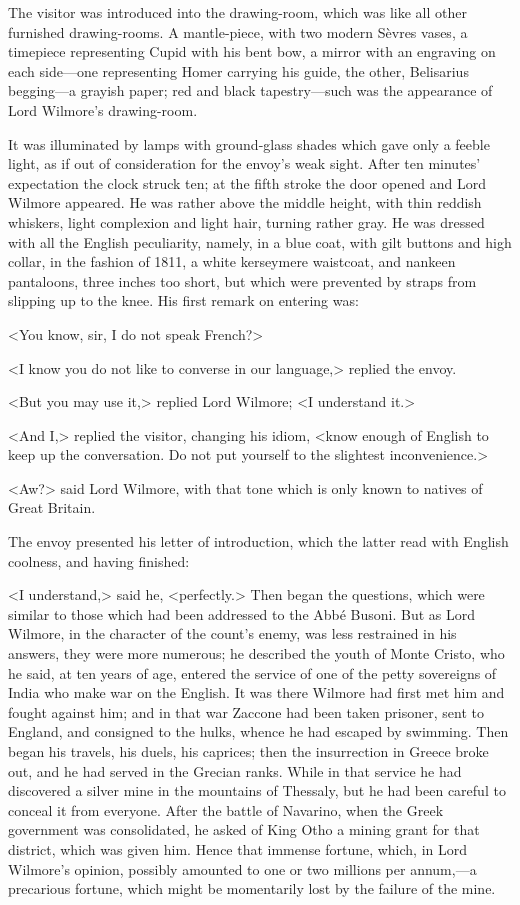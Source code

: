  The visitor was introduced into the drawing-room, which was like all other furnished drawing-rooms. A mantle-piece, with two modern Sèvres vases, a timepiece representing Cupid with his bent bow, a mirror with an engraving on each side—one representing Homer carrying his guide, the other, Belisarius begging—a grayish paper; red and black tapestry—such was the appearance of Lord Wilmore's drawing-room. 

 It was illuminated by lamps with ground-glass shades which gave only a feeble light, as if out of consideration for the envoy's weak sight. After ten minutes' expectation the clock struck ten; at the fifth stroke the door opened and Lord Wilmore appeared. He was rather above the middle height, with thin reddish whiskers, light complexion and light hair, turning rather gray. He was dressed with all the English peculiarity, namely, in a blue coat, with gilt buttons and high collar, in the fashion of 1811, a white kerseymere waistcoat, and nankeen pantaloons, three inches too short, but which were prevented by straps from slipping up to the knee. His first remark on entering was: 

 <You know, sir, I do not speak French?> 

 <I know you do not like to converse in our language,> replied the envoy. 

 <But you may use it,> replied Lord Wilmore; <I understand it.> 

 <And I,> replied the visitor, changing his idiom, <know enough of English to keep up the conversation. Do not put yourself to the slightest inconvenience.> 

 <Aw?> said Lord Wilmore, with that tone which is only known to natives of Great Britain. 

 The envoy presented his letter of introduction, which the latter read with English coolness, and having finished: 

 <I understand,> said he, <perfectly.>  Then began the questions, which were similar to those which had been addressed to the Abbé Busoni. But as Lord Wilmore, in the character of the count's enemy, was less restrained in his answers, they were more numerous; he described the youth of Monte Cristo, who he said, at ten years of age, entered the service of one of the petty sovereigns of India who make war on the English. It was there Wilmore had first met him and fought against him; and in that war Zaccone had been taken prisoner, sent to England, and consigned to the hulks, whence he had escaped by swimming. Then began his travels, his duels, his caprices; then the insurrection in Greece broke out, and he had served in the Grecian ranks. While in that service he had discovered a silver mine in the mountains of Thessaly, but he had been careful to conceal it from everyone. After the battle of Navarino, when the Greek government was consolidated, he asked of King Otho a mining grant for that district, which was given him. Hence that immense fortune, which, in Lord Wilmore's opinion, possibly amounted to one or two millions per annum,—a precarious fortune, which might be momentarily lost by the failure of the mine. 

